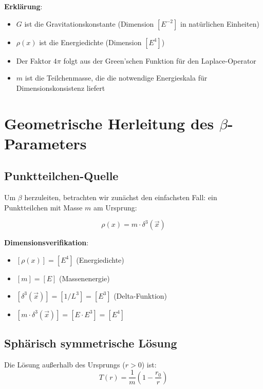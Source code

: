 \documentclass[12pt,a4paper]{article}
\newcommand{\vecx}{\vec{x}}
\begin{document}
	\textbf{Erklärung}: 
	\begin{itemize}
		\item $G$ ist die Gravitationskonstante (Dimension $[E^{-2}]$ in natürlichen Einheiten)
		\item $\rho(x)$ ist die Energiedichte (Dimension $[E^4]$)
		\item Der Faktor $4\pi$ folgt aus der Green'schen Funktion für den Laplace-Operator
		\item $m$ ist die Teilchenmasse, die die notwendige Energieskala für Dimensionskonsistenz liefert
	\end{itemize}
	
	\section{Geometrische Herleitung des $\beta$-Parameters}
	\label{sec:beta_derivation}
	
	\subsection{Punktteilchen-Quelle}
	\label{subsec:point_source_beta}
	
	Um $\beta$ herzuleiten, betrachten wir zunächst den einfachsten Fall: ein Punktteilchen mit Masse $m$ am Ursprung:
	
	\begin{equation}
		\label{eq:point_source_beta}
		\rho(x) = m \cdot \delta^3(\vecx)
	\end{equation}
	
	\textbf{Dimensionsverifikation}:
	\begin{itemize}
		\item $[\rho(x)] = [E^4]$ (Energiedichte)
		\item $[m] = [E]$ (Massenenergie)
		\item $[\delta^3(\vecx)] = [1/L^3] = [E^3]$ (Delta-Funktion)
		\item $[m \cdot \delta^3(\vecx)] = [E \cdot E^3] = [E^4]$ \checkmark
	\end{itemize}
	
	\subsection{Sphärisch symmetrische Lösung}
	\label{subsec:spherical_symmetry_beta}
	
	Die Lösung außerhalb des Ursprungs ($r > 0$) ist:
	\begin{equation}
		T(r) = \frac{1}{m}\left(1 - \frac{r_0}{r}\right)
	\end{equation}
	
\end{document}
